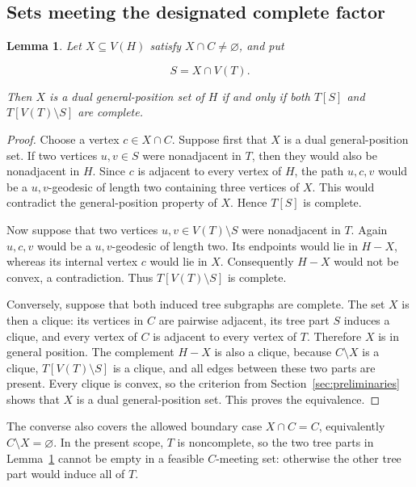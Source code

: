 \documentclass[preprint,12pt]{elsarticle}
\newtheorem{lemma}[theorem]{Lemma}
\numberwithin{equation}{section}
\begin{document}
\subsection{Sets meeting the designated complete factor}\label{sec:apex-meeting}

\begin{lemma}\label{lem:apex-meeting}
Let \(X\subseteq V(H)\) satisfy
\(X\cap C\ne\varnothing\), and put

\[
S=X\cap V(T).
\]

Then \(X\) is a dual general-position set of \(H\) if and only if both
\(T[S]\) and \(T[V(T)\setminus S]\) are complete.
\end{lemma}

\begin{proof}
Choose a vertex \(c\in X\cap C\). Suppose first that
\(X\) is a dual general-position set. If two vertices \(u,v\in S\) were
nonadjacent in \(T\), then they would also be nonadjacent in \(H\).
Since \(c\) is adjacent to every vertex of \(H\), the path \(u,c,v\)
would be a \(u,v\)-geodesic of length two containing three vertices of
\(X\). This would contradict the general-position property of \(X\).
Hence \(T[S]\) is complete.

Now suppose that two vertices \(u,v\in V(T)\setminus S\) were
nonadjacent in \(T\). Again \(u,c,v\) would be a \(u,v\)-geodesic of
length two. Its endpoints would lie in \(H-X\), whereas its internal
vertex \(c\) would lie in \(X\). Consequently \(H-X\) would not be
convex, a contradiction. Thus \(T[V(T)\setminus S]\) is complete.

Conversely, suppose that both induced tree subgraphs are complete. The
set \(X\) is then a clique: its vertices in \(C\) are pairwise adjacent,
its tree part \(S\) induces a clique, and every vertex of \(C\) is
adjacent to every vertex of \(T\). Therefore \(X\) is in general
position. The complement \(H-X\) is also a clique, because
\(C\setminus X\) is a clique, \(T[V(T)\setminus S]\) is a clique, and
all edges between these two parts are present. Every clique is convex,
so the criterion from Section~\ref{sec:preliminaries} shows that \(X\) is a dual
general-position set. This proves the equivalence.
\end{proof}

The converse also covers the allowed boundary case \(X\cap C=C\),
equivalently \(C\setminus X=\varnothing\). In the
present scope, \(T\) is noncomplete, so the two tree parts in Lemma~\ref{lem:apex-meeting}
cannot be empty in a feasible \(C\)-meeting set: otherwise the other tree
part would induce all of \(T\).
\end{document}

